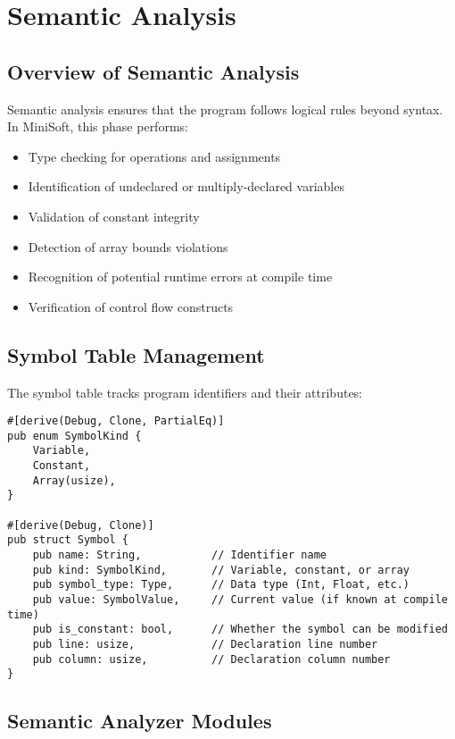 \documentclass[12pt,a4paper]{article}
\begin{document}
\section{Semantic Analysis}
\subsection{Overview of Semantic Analysis}
Semantic analysis ensures that the program follows logical rules beyond syntax. In MiniSoft, this phase performs:

\begin{itemize}
	\item Type checking for operations and assignments
	\item Identification of undeclared or multiply-declared variables
	\item Validation of constant integrity
	\item Detection of array bounds violations
	\item Recognition of potential runtime errors at compile time
	\item Verification of control flow constructs
\end{itemize}

\subsection{Symbol Table Management}
The symbol table tracks program identifiers and their attributes:

\begin{lstlisting}[caption={Symbol Table Structure}]
#[derive(Debug, Clone, PartialEq)]
pub enum SymbolKind {
    Variable,
    Constant,
    Array(usize),
}

#[derive(Debug, Clone)]
pub struct Symbol {
    pub name: String,           // Identifier name
    pub kind: SymbolKind,       // Variable, constant, or array
    pub symbol_type: Type,      // Data type (Int, Float, etc.)
    pub value: SymbolValue,     // Current value (if known at compile time)
    pub is_constant: bool,      // Whether the symbol can be modified
    pub line: usize,            // Declaration line number
    pub column: usize,          // Declaration column number
}
\end{lstlisting}


\subsection{Semantic Analyzer Modules}
\end{document}
